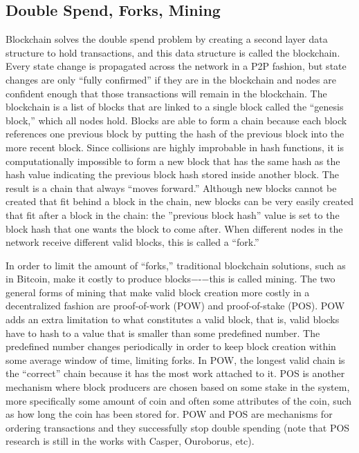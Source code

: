\documentclass[letterpaper, 10 pt, conference]{ieeeconf}  %
\begin{document}
\subsection{Double Spend, Forks, Mining}
Blockchain solves the double spend problem by creating a second layer data structure to hold transactions, and this data structure is called the blockchain. Every state change is propagated across the network in a P2P fashion, but state changes are only “fully confirmed” if they are in the blockchain and nodes are confident enough that those transactions will remain in the blockchain. The blockchain is a list of blocks that are linked to a single block called the “genesis block,” which all nodes hold. Blocks are able to form a chain because each block references one previous block by putting the hash of the previous block into the more recent block. Since collisions are highly improbable in hash functions, it is computationally impossible to form a new block that has the same hash as the hash value indicating the previous block hash stored inside another block. The result is a chain that always “moves forward.” Although new blocks cannot be created that fit behind a block in the chain, new blocks can be very easily created that fit after a block in the chain: the ”previous block hash” value is set to the block hash that one wants the block to come after. When different nodes in the network receive different valid blocks, this is called a “fork.”		

In order to limit the amount of “forks,” traditional blockchain solutions, such as in Bitcoin, make it costly to produce blocks−-−this is called mining. The two general forms of mining that make valid block creation more costly in a decentralized fashion are proof-of-work (POW) and proof-of-stake (POS). POW adds an extra limitation to what constitutes a valid block, that is, valid blocks have to hash to a value that is smaller than some predefined number. The predefined number changes periodically in order to keep block creation within some average window of time, limiting forks. In POW, the longest valid chain is the “correct” chain because it has the most work attached to it. POS is another mechanism where block producers are chosen based on some stake in the system, more specifically some amount of coin and often some attributes of the coin, such as how long the coin has been stored for. POW and POS are mechanisms for ordering transactions and they successfully stop double spending (note that POS research is still in the works with Casper, Ouroborus, etc).
\end{document}
